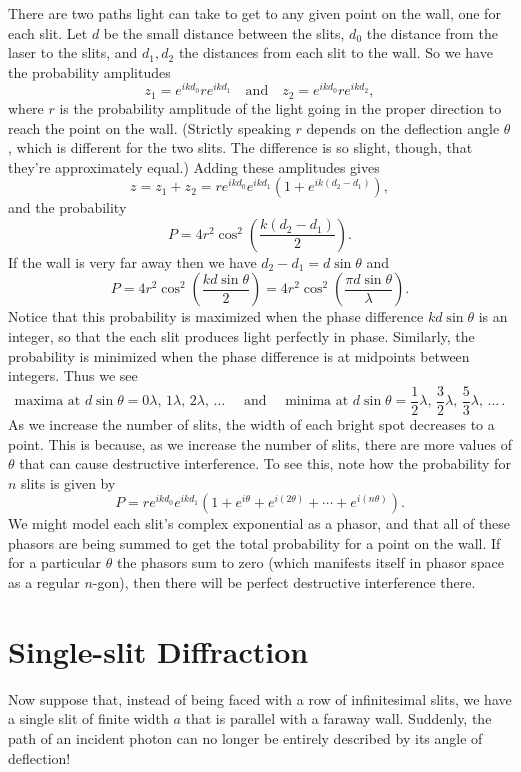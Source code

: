\documentclass[../p051main.tex]{subfiles}
\begin{document}
There are two paths light can take to get to any given point on the wall, one for each slit.
Let $d$ be the small distance between the slits, $d_0$ the distance from the laser to the slits, and $d_1, d_2$ the distances from each slit to the wall.
So we have the probability amplitudes
\[ z_1 = e^{ikd_0} r e^{ikd_1} \quad\textrm{and}\quad z_2 = e^{ikd_0} r e^{ikd_2}, \]
where $r$ is the probability amplitude of the light going in the proper direction to reach the point on the wall.
(Strictly speaking $r$ depends on the deflection angle $\theta$, which is different for the two slits.
The difference is so slight, though, that they're approximately equal.)
Adding these amplitudes gives
\[ z = z_1 + z_2 = r e^{ikd_0} e^{ikd_1} \left( 1 + e^{ik(d_2 - d_1)} \right), \]
and the probability
\[ P = 4r^2 \cos^2 \left( \frac{k(d_2-d_1)}{2} \right). \]
If the wall is very far away then we have $d_2 - d_1 = d \sin \theta$ and
\[ P = 4r^2 \cos^2 \left( \frac{kd\sin \theta}{2} \right) = 4r^2 \cos^2 \left( \frac{\pi d \sin \theta}{\lambda} \right). \]
Notice that this probability is maximized when the phase difference $kd \sin \theta$ is an integer, so that the each slit produces light perfectly in phase.
Similarly, the probability is minimized when the phase difference is at midpoints between integers.
Thus we see
\[ \textrm{maxima at } d \sin \theta = 0\lambda,\, 1\lambda,\, 2\lambda,\, \ldots \quad\textrm{ and }\quad \textrm{minima at } d \sin \theta = \frac{1}{2}\lambda,\, \frac{3}{2}\lambda,\, \frac{5}{3}\lambda,\, \ldots\,. \]
As we increase the number of slits, the width of each bright spot decreases to a point.
This is because, as we increase the number of slits, there are more values of $\theta$ that can cause destructive interference.
To see this, note how the probability for $n$ slits is given by
\[ P = r e^{ikd_0} e^{ikd_1} \left( 1 + e^{i\theta} + e^{i(2\theta)} + \cdots + e^{i(n\theta)} \right). \]
We might model each slit's complex exponential as a phasor, and that all of these phasors are being summed to get the total probability for a point on the wall.
If for a particular $\theta$ the phasors sum to zero (which manifests itself in phasor space as a regular $n$-gon), then there will be perfect destructive interference there.

\section{Single-slit Diffraction}
Now suppose that, instead of being faced with a row of infinitesimal slits, we have a single slit of finite width $a$ that is parallel with a faraway wall.
Suddenly, the path of an incident photon can no longer be entirely described by its angle of deflection!
\end{document}
